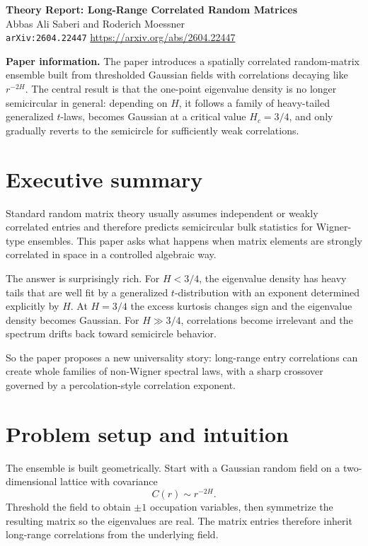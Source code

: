 \documentclass[11pt]{article}
\begin{document}
\begin{center}
{\Large \textbf{Theory Report: Long-Range Correlated Random Matrices}}\\[0.5em]
{\large Abbas Ali Saberi and Roderich Moessner}\\[0.25em]
\texttt{arXiv:2604.22447} \quad \url{https://arxiv.org/abs/2604.22447}
\end{center}

\textbf{Paper information.} The paper introduces a spatially correlated random-matrix ensemble built from thresholded Gaussian fields with correlations decaying like $r^{-2H}$. The central result is that the one-point eigenvalue density is no longer semicircular in general: depending on $H$, it follows a family of heavy-tailed generalized $t$-laws, becomes Gaussian at a critical value $H_c=3/4$, and only gradually reverts to the semicircle for sufficiently weak correlations.

\section*{Executive summary}
Standard random matrix theory usually assumes independent or weakly correlated entries and therefore predicts semicircular bulk statistics for Wigner-type ensembles. This paper asks what happens when matrix elements are strongly correlated in space in a controlled algebraic way.

The answer is surprisingly rich. For $H<3/4$, the eigenvalue density has heavy tails that are well fit by a generalized $t$-distribution with an exponent determined explicitly by $H$. At $H=3/4$ the excess kurtosis changes sign and the eigenvalue density becomes Gaussian. For $H\gg 3/4$, correlations become irrelevant and the spectrum drifts back toward semicircle behavior.

So the paper proposes a new universality story: long-range entry correlations can create whole families of non-Wigner spectral laws, with a sharp crossover governed by a percolation-style correlation exponent.

\section*{Problem setup and intuition}
The ensemble is built geometrically. Start with a Gaussian random field on a two-dimensional lattice with covariance
\[
C(r)\sim r^{-2H}.
\]
Threshold the field to obtain $\pm1$ occupation variables, then symmetrize the resulting matrix so the eigenvalues are real. The matrix entries therefore inherit long-range correlations from the underlying field.
\end{document}
